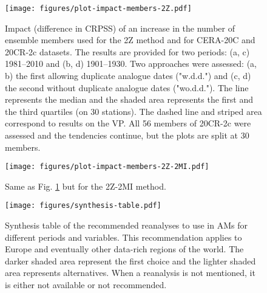 \documentclass{ametsoc}
\begin{document}
\begin{figure}[t]
	\noindent\texttt{[image: figures/plot-impact-members-2Z.pdf]}\\
	\caption{Impact (difference in CRPSS) of an increase in the number of ensemble members used for the 2Z method and for CERA-20C and 20CR-2c datasets. The results are provided for two periods: (a, c) 1981--2010 and (b, d) 1901--1930. Two approaches were assessed: (a, b) the first allowing duplicate analogue dates ("w.d.d.") and (c, d) the second without duplicate analogue dates ("wo.d.d."). The line represents the median and the shaded area represents the first and the third quartiles (on 30 stations). The dashed line and striped area correspond to results on the VP. All 56 members of 20CR-2c were assessed and the tendencies continue, but the plots are split at 30 members.}
	\label{fig:plot_impact_members_2Z}
\end{figure}

\begin{figure}[t]
	\noindent\texttt{[image: figures/plot-impact-members-2Z-2MI.pdf]}\\
	\caption{Same as Fig. \ref{fig:plot_impact_members_2Z} but for the 2Z-2MI method.}
	\label{fig:plot_impact_members_2Z-2MI}
\end{figure}

\begin{figure}[t]
	\noindent\texttt{[image: figures/synthesis-table.pdf]}\\
	\caption{Synthesis table of the recommended reanalyses to use in AMs for different periods and variables. This recommendation applies to Europe and eventually other data-rich regions of the world. The darker shaded area represent the first choice and the lighter shaded area represents alternatives. When a reanalysis is not mentioned, it is either not available or not recommended.}
	\label{fig:synthesis-table}
\end{figure}
\end{document}
